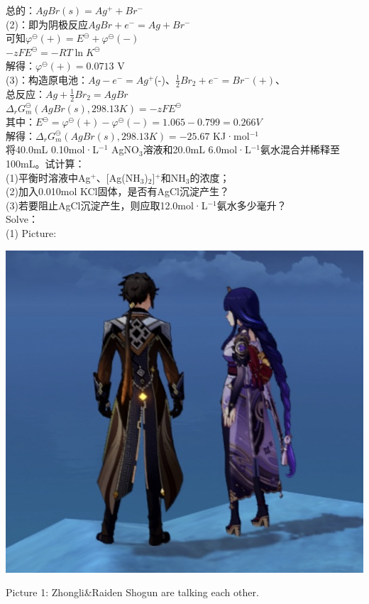 \documentclass[UTF8]{ctexart}
\begin{document}
总的：$AgBr(s)=Ag^++Br^-$\\
(2)：即为阴极反应$AgBr+e^-=Ag+Br^-$\\
可知$ \varphi^\ominus(+)=E^\ominus+\varphi^\ominus(-)$\\
$ -zFE^\ominus=-RT\ln K^\ominus $\\
解得：$ \varphi^\ominus(+)=0.0713$ V\\
(3)：构造原电池：$ Ag-e^-=Ag^+$(-)、$ \frac{1}{2}Br_2+e^-=Br^-(+)$、\\
总反应：$Ag+\frac{1}{2}Br_2=AgBr$\\
$\Delta_rG_m^\ominus(AgBr(s),298.13K)=-zFE^\ominus$\\
其中：$ E^\ominus=\varphi^\ominus(+)-\varphi^\ominus(-)=1.065-0.799=0.266V$\\
解得：$ \Delta_rG_m^\ominus(AgBr(s),298.13K)=-25.67$ KJ·mol$^{-1}$\\
\newpage
将40.0mL 0.10mol·L$^{-1}$ AgNO$_3$溶液和20.0mL 6.0mol·L$^{-1}$氨水混合并稀释至100mL。试计算：\\
(1)平衡时溶液中Ag$^+$、[Ag(NH$_3$)$_2$]$^+$和NH$_3$的浓度；\\
(2)加入0.010mol KCl固体，是否有AgCl沉淀产生？\\
(3)若要阻止AgCl沉淀产生，则应取12.0mol·L$^{-1}$氨水多少毫升？\\
Solve：\\
(1)
\newpage
Picture:\\
\centerline{\includegraphics[width = .4\textwidth]{Demo.jpg}}
\centerline{Picture 1: Zhongli\&Raiden Shogun are talking each other.}
\end{document}
